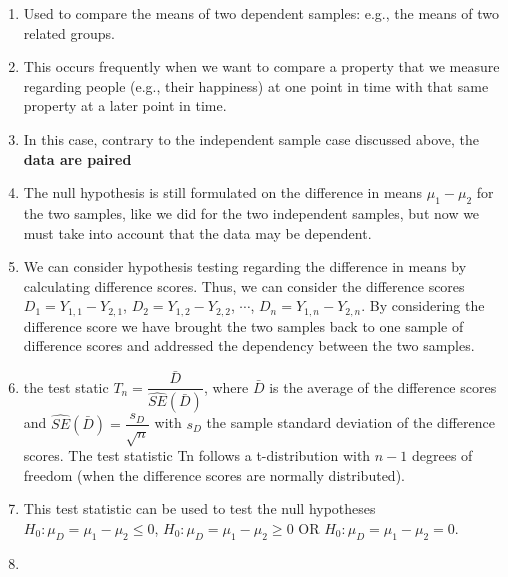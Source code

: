 \begin{enumerate}
    \item Used to compare the means of two dependent samples: e.g., the means of two related groups.
    \hfill \cite{statistics/book/Statistics-for-Data-Scientists/Maurits-Kaptein}

    \item This occurs frequently when we want to compare a property that we measure regarding people (e.g., their happiness) at one point in time with that same property at a later point in time.
    \hfill \cite{statistics/book/Statistics-for-Data-Scientists/Maurits-Kaptein}

    \item  In this case, contrary to the independent sample case discussed above, the \textbf{data are paired}
    \hfill \cite{statistics/book/Statistics-for-Data-Scientists/Maurits-Kaptein}

    \item The null hypothesis is still formulated on the difference in means $\mu_1 - \mu_2$ for the two samples, like we did for the two independent samples, but now we must take into account that the data may be dependent.
    \hfill \cite{statistics/book/Statistics-for-Data-Scientists/Maurits-Kaptein}

    \item We can consider hypothesis testing regarding the difference in means by calculating difference scores. 
    Thus, we can consider the difference scores $D_1 = Y_{1,1} - Y_{2,1}$, $D_2 = Y_{1,2} - Y_{2,2}$, $\cdots$, $D _n = Y_{1,n} - Y_{2,n} $. 
    By considering the difference score we have brought the two samples back to one sample of difference scores and addressed the dependency between the two samples.
    \hfill \cite{statistics/book/Statistics-for-Data-Scientists/Maurits-Kaptein}

    \item the test static $T_n = \dfrac{\bar{D}}{\hat{S E}(\bar{D})}$, where $\bar{D}$ is the average of the difference scores and $\hat{S E}(\bar{D}) = \dfrac{s_ D}{\sqrt{n}}$ with $s _D$ the sample standard deviation of the difference scores.
    The test statistic Tn follows a t-distribution with $n - 1$ degrees of freedom (when the difference scores are normally distributed).
    \hfill \cite{statistics/book/Statistics-for-Data-Scientists/Maurits-Kaptein}

    \item This test statistic can be used to test the null hypotheses 
    $H_0 : \mu_D = \mu_1 - \mu_2 \leq 0$, 
    $H_0 : \mu_D = \mu_1 - \mu_2 \geq 0$ OR
    $H_0 : \mu_D = \mu_1 - \mu_2 = 0$.
    \hfill \cite{statistics/book/Statistics-for-Data-Scientists/Maurits-Kaptein}

    \item 
\end{enumerate}




